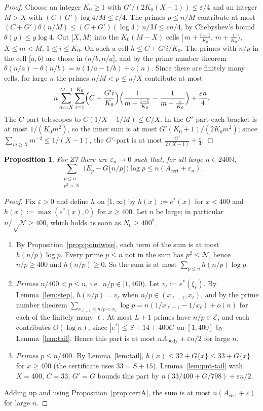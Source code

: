 \documentclass[11pt]{amsart}
\newtheorem{proposition}[theorem]{Proposition}
\theoremstyle{definition}
\theoremstyle{remark}
\numberwithin{equation}{section}
\newcommand{\NN}{\mathbb{N}}
\newcommand{\cN}{\mathcal{N}}
\newcommand{\cE}{\mathcal{E}}
\newcommand{\Acert}{A_{\mathrm{cert}}}
\newcommand{\Abody}{A_{\mathrm{body}}}
\newcommand{\eps}{\varepsilon}
\begin{document}
\begin{proof}
Choose an integer $K_0\ge1$ with $G'/(2K_0(X-1))\le\eps/4$ and an integer $M>X$ with
$(C+G')\log4/M\le\eps/4$. The primes $p\le n/M$ contribute at most $(C+G')\theta(n/M)\le(C+G')(\log4)\,n/M\le\eps n/4$,
by Chebyshev's bound $\theta(y)\le y\log4$. Cut $[X,M)$ into the $K_0(M-X)$ cells
$[\,m+\frac{i-1}{K_0},\,m+\frac i{K_0})$, $X\le m<M$, $1\le i\le K_0$. On such a cell $h\le C+G'i/K_0$. The primes
with $n/p$ in the cell $[a,b)$ are those in $(n/b,n/a]$, and by the prime number theorem
$\theta(n/a)-\theta(n/b)=n(1/a-1/b)+o(n)$. Since there are finitely many cells, for large $n$ the primes
$n/M<p\le n/X$ contribute at most
\[
  n\sum_{m=X}^{M-1}\sum_{i=1}^{K_0}\Bigl(C+\frac{G'i}{K_0}\Bigr)
  \Bigl(\frac1{m+\frac{i-1}{K_0}}-\frac1{m+\frac i{K_0}}\Bigr)+\frac{\eps n}4 .
\]
The $C$-part telescopes to $C(1/X-1/M)\le C/X$. In the $G'$-part each bracket is at most $1/(K_0m^2)$, so the inner
sum is at most $G'(K_0+1)/(2K_0m^2)$; since $\sum_{m\ge X}m^{-2}\le1/(X-1)$, the $G'$-part is at most
$\frac{G'}{2(X-1)}+\frac\eps4$.
\end{proof}

\begin{proposition}\label{prop:lemma5}
For Z7 there are $\eps_n\to0$ such that, for all large $n\in240\NN$,
\[
  \sum_{\substack{p\le n\\p^2>\cN}}\bigl(E_p-G\lfloor n/p\rfloor\bigr)\log p\le n(\Acert+\eps_n).
\]
\end{proposition}

\begin{proof}
Fix $\eps>0$ and define $h$ on $[1,\infty)$ by $h(x):=e^*(x)$ for $x<400$ and $h(x):=\max(e^*(x),0)$ for
$x\ge400$. Let $n$ be large; in particular $n/\sqrt\cN\ge400$, which holds as soon as $N_0\ge400^2$.
\begin{enumerate}
\item By Proposition~\ref{prop:pointwise}, each term of the sum is at most $h(n/p)\log p$. Every prime $p\le n$
  not in the sum has $p^2\le\cN$, hence $n/p\ge400$ and $h(n/p)\ge0$. So the sum is at most
  $\sum_{p\le n}h(n/p)\log p$.
\item \emph{Primes $n/400<p\le n$}, i.e.\ $n/p\in[1,400)$. Let $v_\ell:=e^*(\xi_\ell)$. By Lemma~\ref{lem:step},
  $h(n/p)=v_\ell$ when $n/p\in(x_{\ell-1},x_\ell)$, and by the prime number theorem
  $\sum_{x_{\ell-1}<n/p<x_\ell}\log p=n(1/x_{\ell-1}-1/x_\ell)+o(n)$ for each of the finitely many $\ell$. At most
  $L+1$ primes have $n/p\in\cE$, and each contributes $O(\log n)$, since $|e^*|\le S+14+400G$ on $[1,400]$ by
  Lemma~\ref{lem:tail}. Hence this part is at most $n\Abody+\eps n/2$ for large $n$.
\item \emph{Primes $p\le n/400$.} By Lemma~\ref{lem:tail}, $h(x)\le32+G\{x\}\le33+G\{x\}$ for $x\ge400$ (the
  certificate uses $33=S+15$). Lemma~\ref{lem:pnt-tail} with $X=400$, $C=33$, $G'=G$ bounds this part by
  $n(33/400+G/798)+\eps n/2$.
\end{enumerate}
Adding up and using Proposition~\ref{prop:certA}, the sum is at most $n(\Acert+\eps)$ for large $n$.
\end{proof}
\end{document}
